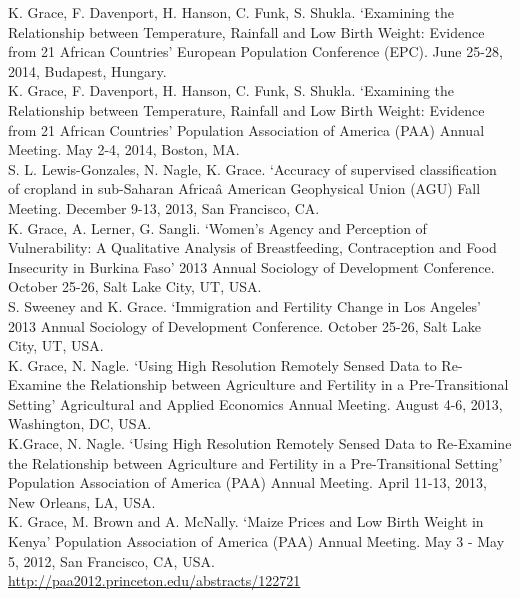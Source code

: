 \documentclass[11pt]{article} %
\begin{document}
\noindent
K. Grace, F. Davenport, H. Hanson, C. Funk, S. Shukla. `Examining the Relationship between Temperature, Rainfall and Low Birth Weight: Evidence from 21 African Countries' European Population Conference (EPC).  June 25-28, 2014, Budapest, Hungary. \\

\noindent
K. Grace, F. Davenport, H. Hanson, C. Funk, S. Shukla. `Examining the Relationship between Temperature, Rainfall and Low Birth Weight: Evidence from 21 African Countries' Population Association of America (PAA) Annual Meeting.  May 2-4, 2014, Boston, MA. \\

\noindent
S. L. Lewis-Gonzales, N. Nagle, K. Grace. `Accuracy of supervised classification of cropland in sub-Saharan Africaâ  American Geophysical Union (AGU) Fall Meeting. December 9-13, 2013, San Francisco, CA.\\

\noindent
K. Grace, A. Lerner, G. Sangli. `Women's Agency and Perception of Vulnerability: A Qualitative Analysis of Breastfeeding, Contraception and Food Insecurity in Burkina Faso' 2013 Annual Sociology of Development Conference. October 25-26, Salt Lake City, UT, USA.\\

\noindent
S. Sweeney and K. Grace. `Immigration and Fertility Change in Los Angeles' 2013 Annual Sociology of Development Conference. October 25-26, Salt Lake City, UT, USA.\\


\noindent
K. Grace, N. Nagle. `Using High Resolution Remotely Sensed Data to Re-Examine the Relationship between Agriculture and Fertility in a Pre-Transitional Setting'  Agricultural and Applied Economics Annual Meeting. August 4-6, 2013, Washington, DC, USA.\\

\noindent
K.Grace, N. Nagle. `Using High Resolution Remotely Sensed Data to Re-Examine the Relationship between Agriculture and Fertility in a Pre-Transitional Setting' Population Association of America (PAA) Annual Meeting.  April 11-13, 2013, New Orleans, LA, USA. \\

\noindent
K. Grace, M. Brown and A. McNally. `Maize Prices and Low Birth Weight in Kenya'  Population Association of America (PAA) Annual Meeting. May 3 - May 5, 2012, San Francisco, CA, USA.\\
\url{http://paa2012.princeton.edu/abstracts/122721}\\
\end{document}

